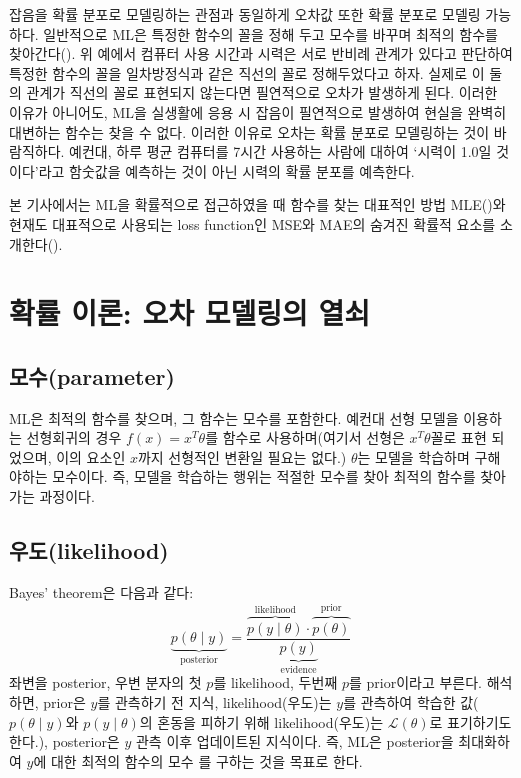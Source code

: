 \documentclass{article}
\begin{document}
잡음을 확률 분포로 모델링하는 관점과 동일하게 오차값 또한 확률 분포로 모델링 가능하다. 일반적으로 ML은 특정한 함수의 꼴을 정해 두고 모수를 바꾸며 최적의 함수를 찾아간다(). 위 예에서 컴퓨터 사용 시간과 시력은 서로 반비례 관계가 있다고 판단하여 특정한 함수의 꼴을 일차방정식과 같은 직선의 꼴로 정해두었다고 하자. 실제로 이 둘의 관계가 직선의 꼴로 표현되지 않는다면 필연적으로 오차가 발생하게 된다. 이러한 이유가 아니어도, ML을 실생활에 응용 시 잡음이 필연적으로 발생하여 현실을 완벽히 대변하는 함수는 찾을 수 없다. 이러한 이유로 오차는 확률 분포로 모델링하는 것이 바람직하다. 예컨대, 하루 평균 컴퓨터를 7시간 사용하는 사람에 대하여 `시력이 1.0일 것이다'라고 함숫값을 예측하는 것이 아닌 시력의 확률 분포를 예측한다.

본 기사에서는 ML을 확률적으로 접근하였을 때 함수를 찾는 대표적인 방법 MLE()와 현재도 대표적으로 사용되는 loss function인 MSE와 MAE의 숨겨진 확률적 요소를 소개한다().

\section{확률 이론: 오차 모델링의 열쇠}
\label{sec:probability}

\subsection{모수(parameter)}
\label{subsec:parameter}
ML은 최적의 함수를 찾으며, 그 함수는 모수를 포함한다. 예컨대 선형 모델을 이용하는 선형회귀의 경우 $f(x)=x^T\theta$를 함수로 사용하며(여기서 선형은 $x^T\theta$꼴로 표현 되었으며, 이의 요소인 $x$까지 선형적인 변환일 필요는 없다.) $\theta$는 모델을 학습하며 구해야하는 모수이다. 즉, 모델을 학습하는 행위는 적절한 모수를 찾아 최적의 함수를 찾아가는 과정이다.

\subsection{우도(likelihood)}
\label{subsec:likelihood}
Bayes’ theorem은 다음과 같다:
\begin{equation}
  \underbrace{p(\theta \mid y)}_{\text{posterior}} = \frac{\overbrace{p(y \mid \theta)}^{\text{likelihood}} \cdot \overbrace{p(\theta)}^{\text{prior}}}{\underbrace{p(y)}_{\text{evidence}}}
\end{equation}
좌변을 posterior, 우변 분자의 첫 $p$를 likelihood, 두번째 $p$를 prior이라고 부른다. 해석하면, prior은 $y$를 관측하기 전 지식, likelihood(우도)는 $y$를 관측하여 학습한 값($p(\theta \mid y)$와 $p(y \mid \theta)$의 혼동을 피하기 위해 likelihood(우도)는 $\mathcal{L}(\theta)$로 표기하기도 한다.), posterior은 $y$ 관측 이후 업데이트된 지식이다. 즉, ML은 posterior을 최대화하여 $y$에 대한 최적의 함수의 모수 를 구하는 것을 목표로 한다.
\end{document}
